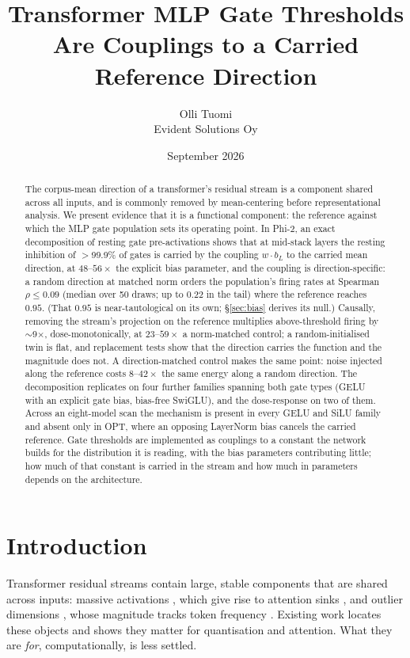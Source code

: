 \documentclass[11pt]{article}
\title{Transformer MLP Gate Thresholds Are Couplings
to a Carried Reference Direction}
\author{Olli Tuomi\\Evident Solutions Oy}
\date{September 2026}
\newcommand{\bl}{b_L}
\begin{document}
\maketitle

\begin{abstract}
The corpus-mean direction of a transformer's residual stream is a
component shared across all inputs, and is commonly removed by
mean-centering before representational analysis. We present evidence
that it is a functional component: the reference against which the MLP
gate population sets its operating point. In Phi-2, an exact
decomposition of resting gate pre-activations shows that at mid-stack
layers the resting inhibition of $>$99.9\% of gates is carried by the
coupling $w\cdot\bl$ to the carried mean direction, at $48$--$56\times$
the explicit bias parameter, and the coupling is direction-specific: a
random direction at matched norm orders the population's firing rates at
Spearman $\rho \leq 0.09$ (median over 50 draws; up to $0.22$ in the tail) where
the reference reaches $0.95$. (That $0.95$ is near-tautological on its
own; \S\ref{sec:bias} derives its null.) Causally, removing the stream's
projection on the reference multiplies above-threshold firing by
$\sim$9$\times$, dose-monotonically, at $23$--$59\times$ a norm-matched
control; a random-initialised twin is flat, and replacement tests show
that the direction carries the function and the magnitude does not. A
direction-matched control makes the same point: noise
injected along the reference costs $8$--$42\times$ the same energy
along a random direction. The decomposition replicates on four further families
spanning both gate types (GELU with an explicit gate bias, bias-free
SwiGLU), and the dose-response on two of them. Across an eight-model
scan the mechanism is present in every GELU and SiLU family and absent
only in OPT, where an opposing LayerNorm bias cancels the carried
reference. Gate thresholds are implemented as couplings to a constant
the network builds for the distribution it is reading, with the bias
parameters contributing little; how much of that constant is carried in
the stream and how much in parameters depends on the architecture.
\end{abstract}

\section{Introduction}

Transformer residual streams contain large, stable components that are
shared across inputs: massive activations \citep{sun2024}, which give
rise to attention sinks \citep{xiao2023,sun2024}, and outlier dimensions
\citep{kovaleva2021,timkey2021}, whose magnitude tracks token frequency
\citep{puccetti2022}. Existing work
locates these objects and shows they matter for quantisation and
attention. What they are \emph{for}, computationally, is less settled.
\end{document}
